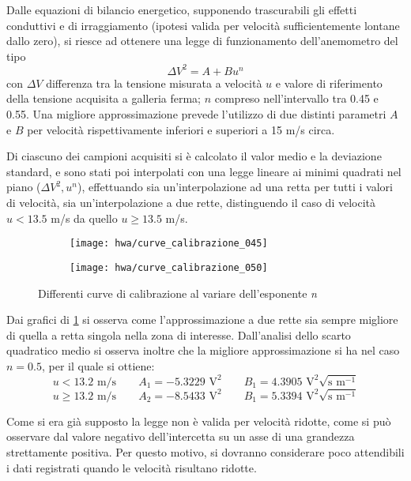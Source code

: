 \documentclass{article} %
\begin{document}
Dalle equazioni di bilancio energetico, supponendo trascurabili gli effetti conduttivi e di irraggiamento (ipotesi valida per velocità sufficientemente lontane dallo zero), si riesce ad ottenere una legge di funzionamento dell'anemometro del tipo $$\Delta V ^ 2 = A + B u^{n}$$ con $\Delta V$ differenza tra la tensione misurata a velocità $u$ e valore di riferimento della tensione acquisita a galleria ferma; $n$ compreso nell'intervallo tra 0.45 e 0.55. Una migliore approssimazione prevede l'utilizzo di due distinti parametri $A$ e $B$ per velocità rispettivamente inferiori e superiori a 15 m/s circa.\par
Di ciascuno dei campioni acquisiti si è calcolato il valor medio e la deviazione standard, e sono stati poi interpolati con una legge lineare ai minimi quadrati nel piano ($\Delta V ^ 2, u^n$), effettuando sia un'interpolazione ad una retta per tutti i valori di velocità, sia un'interpolazione a due rette, distinguendo il caso di velocità $u < 13.5$ m/s da quello $u \geq 13.5$ m/s.
\begin{figure}[!ht]
	\begin{subfigure}{0.5\textwidth}
		\texttt{[image: hwa/curve\_calibrazione\_045]}
	\end{subfigure}
	\begin{subfigure}{0.5\textwidth}
		\texttt{[image: hwa/curve\_calibrazione\_050]}
	\end{subfigure}
	\caption{Differenti curve di calibrazione al variare dell'esponente \textit{n}}
	\label{fig:calibrazione_hwa}
\end{figure}

Dai grafici di \cref{fig:calibrazione_hwa} si osserva come l'approssimazione a due rette sia sempre migliore di quella a retta singola nella zona di interesse. Dall'analisi dello scarto quadratico medio si osserva inoltre che la migliore approssimazione si ha nel caso $n = 0.5$, per il quale si ottiene:
\begin{displaymath}
	u < 13.2 \textrm{ m/s} \qquad A_1 = -5.3229 \textrm{ V}^2 \qquad B_1 = 4.3905 \textrm{ V}^2 \sqrt{\textrm{s m}^{-1}}
\end{displaymath}
\begin{displaymath}
	u \ge 13.2 \textrm{ m/s} \qquad A_2 = -8.5433 \textrm{ V}^2 \qquad B_1 = 5.3394 \textrm{ V}^2 \sqrt{\textrm{s m}^{-1}}
\end{displaymath}\par
Come si era già supposto la legge non è valida per velocità ridotte, come si può osservare dal valore negativo dell'intercetta su un asse di una grandezza strettamente positiva. Per questo motivo, si dovranno considerare poco attendibili i dati registrati quando le velocità risultano ridotte.
\end{document}
